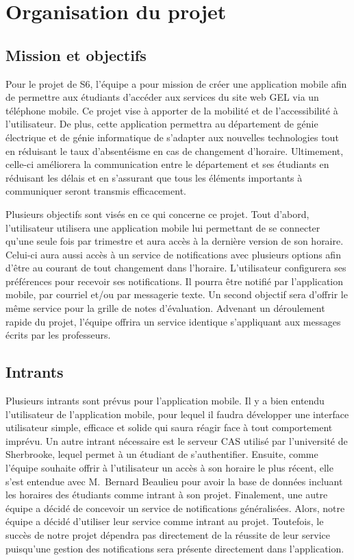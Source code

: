 \section{Organisation du projet}
	\subsection{Mission et objectifs}
	Pour le projet de S6, l’équipe a pour mission de créer une application mobile afin de permettre aux étudiants d’accéder aux services du site web GEL via un téléphone mobile. Ce projet vise à apporter de la mobilité et de l’accessibilité à l’utilisateur. De plus, cette application permettra au département de génie électrique et de génie informatique de s’adapter aux nouvelles technologies tout en réduisant le taux d’absentéisme en cas de changement d’horaire. Ultimement, celle-ci améliorera la communication entre le département et ses étudiants en réduisant les délais et en s’assurant que tous les éléments importants à communiquer seront transmis efficacement.

	Plusieurs objectifs sont visés en ce qui concerne ce projet. Tout d’abord, l’utilisateur utilisera une application mobile lui permettant de se connecter qu’une seule fois par trimestre et aura accès à la dernière version de son horaire. Celui-ci aura aussi accès à un service de notifications avec plusieurs options afin d’être au courant de tout changement dans l’horaire. L’utilisateur configurera ses préférences pour recevoir ses notifications. Il pourra être notifié par l’application mobile, par courriel et/ou par messagerie texte. Un second objectif sera d’offrir le même service pour la grille de notes d'évaluation. Advenant un déroulement rapide du projet, l’équipe offrira un service identique s’appliquant aux messages écrits par les professeurs.
	
	\subsection{Intrants}
	Plusieurs intrants sont prévus pour l’application mobile. Il y a bien entendu l’utilisateur de l’application mobile, pour lequel il faudra développer une interface utilisateur simple, efficace et solide qui saura réagir face à tout comportement imprévu. Un autre intrant nécessaire est le serveur CAS utilisé par l’université de Sherbrooke, lequel permet à un étudiant de s’authentifier. Ensuite, comme l’équipe souhaite offrir à l’utilisateur un accès à son horaire le plus récent, elle s’est entendue avec M.~Bernard Beaulieu pour avoir la base de données incluant les horaires des étudiants comme intrant à son projet. Finalement, une autre équipe a décidé de concevoir un service de notifications généralisées. Alors, notre équipe a décidé d’utiliser leur service comme intrant au projet. Toutefois, le succès de notre projet dépendra pas directement de la réussite de leur service puisqu’une gestion des notifications sera présente directement dans l’application.

